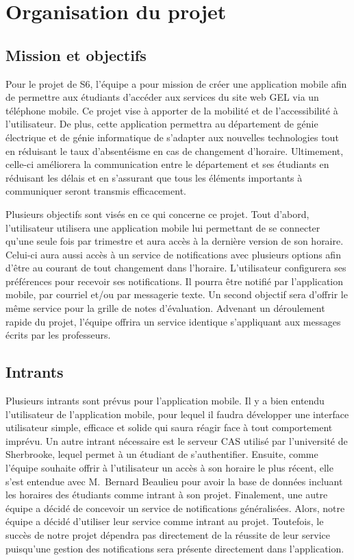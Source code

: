 \section{Organisation du projet}
	\subsection{Mission et objectifs}
	Pour le projet de S6, l’équipe a pour mission de créer une application mobile afin de permettre aux étudiants d’accéder aux services du site web GEL via un téléphone mobile. Ce projet vise à apporter de la mobilité et de l’accessibilité à l’utilisateur. De plus, cette application permettra au département de génie électrique et de génie informatique de s’adapter aux nouvelles technologies tout en réduisant le taux d’absentéisme en cas de changement d’horaire. Ultimement, celle-ci améliorera la communication entre le département et ses étudiants en réduisant les délais et en s’assurant que tous les éléments importants à communiquer seront transmis efficacement.

	Plusieurs objectifs sont visés en ce qui concerne ce projet. Tout d’abord, l’utilisateur utilisera une application mobile lui permettant de se connecter qu’une seule fois par trimestre et aura accès à la dernière version de son horaire. Celui-ci aura aussi accès à un service de notifications avec plusieurs options afin d’être au courant de tout changement dans l’horaire. L’utilisateur configurera ses préférences pour recevoir ses notifications. Il pourra être notifié par l’application mobile, par courriel et/ou par messagerie texte. Un second objectif sera d’offrir le même service pour la grille de notes d'évaluation. Advenant un déroulement rapide du projet, l’équipe offrira un service identique s’appliquant aux messages écrits par les professeurs.
	
	\subsection{Intrants}
	Plusieurs intrants sont prévus pour l’application mobile. Il y a bien entendu l’utilisateur de l’application mobile, pour lequel il faudra développer une interface utilisateur simple, efficace et solide qui saura réagir face à tout comportement imprévu. Un autre intrant nécessaire est le serveur CAS utilisé par l’université de Sherbrooke, lequel permet à un étudiant de s’authentifier. Ensuite, comme l’équipe souhaite offrir à l’utilisateur un accès à son horaire le plus récent, elle s’est entendue avec M.~Bernard Beaulieu pour avoir la base de données incluant les horaires des étudiants comme intrant à son projet. Finalement, une autre équipe a décidé de concevoir un service de notifications généralisées. Alors, notre équipe a décidé d’utiliser leur service comme intrant au projet. Toutefois, le succès de notre projet dépendra pas directement de la réussite de leur service puisqu’une gestion des notifications sera présente directement dans l’application.

